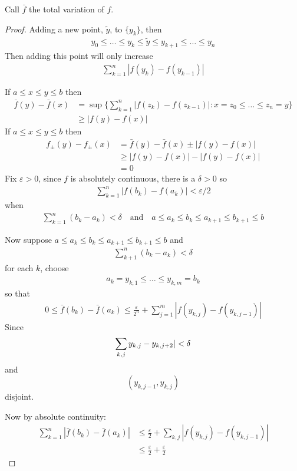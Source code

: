 \begin{notation}
	Call $\bar{f}$ the total variation of $f$.
\end{notation}

\begin{proof}
	Adding a new point, $\tilde{y}$, to $\{y_{k}\}$, then
	\begin{align*}
		y_0 \leq \ldots \leq y_k \leq \tilde{y} \leq y_{k+1} \leq \ldots \leq y_n
	\end{align*}
	Then adding this point will only increase
	\begin{align*}
		\sum_{k=1}^n | f( y_k) - f(y_{k-1}) |
	\end{align*}

	If $a \leq x \leq y \leq b$ then
	\begin{align*}
		\bar{f} (y) - \bar{f}(x) &= \sup \{\sum_{k=1}^{n} |f (z_k) - f (z_{k - 1}) | : x = z_0 \leq \ldots \leq z_n = y \} \\
								 &\geq | f(y) - f(x) |
	\end{align*}
	If $a \leq x \leq y \leq b$ then
	 \begin{align*}
		 f_{\pm} (y) - f_{\pm} (x) &= \bar{f} (y) - \bar{f} (x) \pm | f(y) - f(x) | \\
								   &\geq |f(y) - f(x) | - | f(y) - f(x)| \\
								   &= 0
	\end{align*}
	Fix $\varepsilon > 0$, since $f$ is absolutely continuous, there is a $\delta > 0$ so
	\begin{align*}
		\sum_{k=1}^n | f (b_{k}) - f (a_k) | < \varepsilon/2
	\end{align*} when
	\begin{align*}
		\sum_{k=1}^n (b_k - a_k) < \delta \quad \text{and} \quad a \leq a_k \leq b_k \leq a_{k+1} \leq b_{k+1} \leq b
	\end{align*}


	Now suppose $a \leq a_k \leq b_k \leq a_{k+1} \leq b_{k+1} \leq b$
	and
	\begin{align*}
		\sum_{k+1}^n (b_k - a_k) < \delta
	\end{align*}
	for each $k$, choose
	\begin{align*}
		a_k = y_{k,1} \leq \ldots \leq y_{k, m} = b_k
	\end{align*} so that
	\begin{align*}
		0 \leq \bar{f}(b_k) - \bar{f} (a_k) \leq \frac{\varepsilon}{2^{n}} + \sum_{j=1}^m |f(y_{k,j}) - f(y_{k, j-1}) |
	\end{align*}
	Since
	\[
		\sum_{k,j} y_{k,j} - y_{k,j+2} | < \delta \\
	\] and
	\[
		(y_{k, j-1}, y_{k,j})
	\] disjoint.

	Now by absolute continuity:
	\begin{align*}
		\sum_{k=1}^{n} | \bar{f}(b_k) - \bar{f}(a_k) | &\leq \frac{\varepsilon}{2} + \sum_{k,j} |f (y_{k,j}) - f(y_{k,j-1}) | \\
													   &\leq \frac{\varepsilon}{2} + \frac{\varepsilon}{2}
	\end{align*}

\end{proof}

